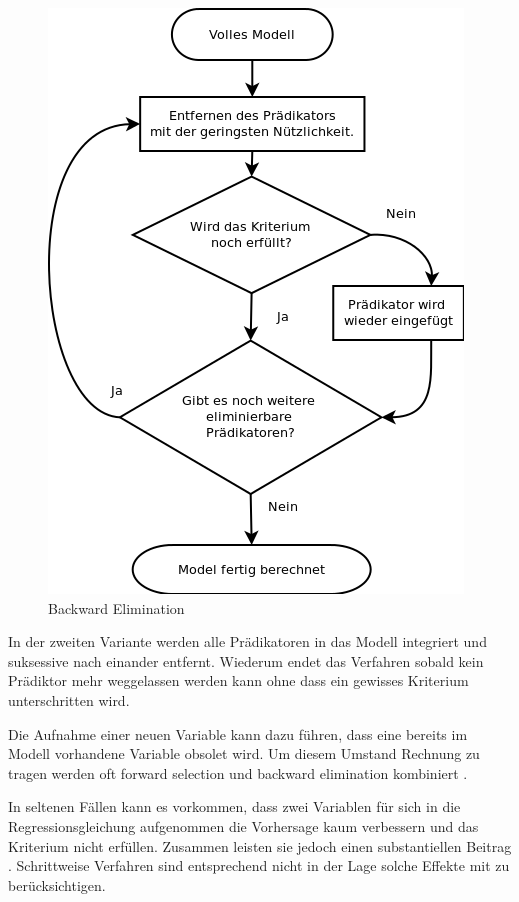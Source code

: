\begin{figure}[H]
	\centering
	\includegraphics[height=0.5\textheight]{backward_stepwise.png}
	\caption{Backward Elimination}
	\label{fig:backward_stepwise}
\end{figure}
In der zweiten Variante werden alle Prädikatoren in das Modell integriert und suksessive nach einander entfernt. Wiederum endet das Verfahren sobald kein Prädiktor mehr weggelassen werden kann ohne dass ein gewisses Kriterium unterschritten wird.

Die Aufnahme einer neuen Variable kann dazu führen, dass eine bereits im Modell vorhandene Variable obsolet wird. 
Um diesem Umstand Rechnung zu tragen werden oft forward selection und backward elimination kombiniert \cite[p. 461]{bortz2011}. 

In seltenen Fällen kann es vorkommen, dass zwei Variablen für sich in die Regressionsgleichung aufgenommen die Vorhersage kaum verbessern und das Kriterium nicht erfüllen. Zusammen leisten sie jedoch  einen substantiellen Beitrag \cite[p.261]{jacob2003applied}. 
Schrittweise Verfahren sind entsprechend nicht in der Lage solche Effekte mit zu berücksichtigen. 

